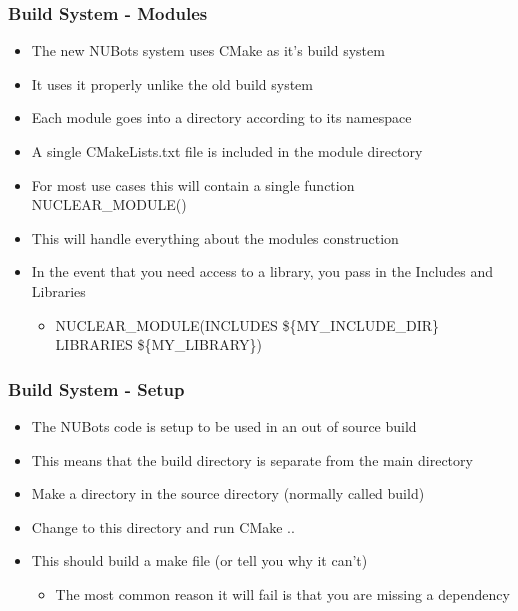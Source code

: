 \documentclass{beamer}
\begin{document}
\begin{frame}
	\frametitle{Build System - Modules}
	\begin{itemize}
		\item The new NUBots system uses CMake as it's build system
		\item It uses it properly unlike the old build system
		\item Each module goes into a directory according to its namespace
		\item A single CMakeLists.txt file is included in the module directory
		\item For most use cases this will contain a single function NUCLEAR\_MODULE()
		\item This will handle everything about the modules construction
		\item In the event that you need access to a library, you pass in the Includes and Libraries
		\begin{itemize}
			\item NUCLEAR\_MODULE(INCLUDES \$\{MY\_INCLUDE\_DIR\} LIBRARIES \$\{MY\_LIBRARY\})
		\end{itemize}
	\end{itemize}
\end{frame}

\begin{frame}
	\frametitle{Build System - Setup}
	\begin{itemize}
		\item The NUBots code is setup to be used in an out of source build
		\item This means that the build directory is separate from the main directory
		\item Make a directory in the source directory (normally called build)
		\item Change to this directory and run CMake ..
		\item This should build a make file (or tell you why it can't)
		\begin{itemize}
			\item The most common reason it will fail is that you are missing a dependency
		\end{itemize}
	\end{itemize}
\end{frame}
\end{document}
